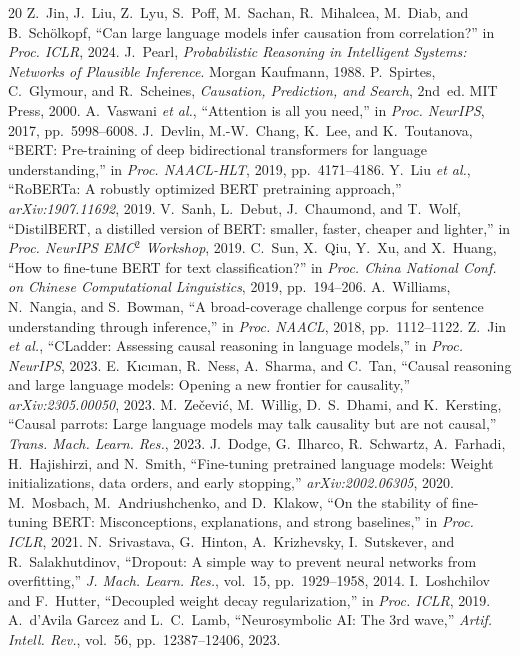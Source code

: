 \documentclass[conference]{IEEEtran}
\begin{document}
\begin{thebibliography}{20}
 Z.~Jin, J.~Liu, Z.~Lyu, S.~Poff, M.~Sachan, R.~Mihalcea, M.~Diab, and B.~Sch\"olkopf,
``Can large language models infer causation from correlation?'' in \emph{Proc. ICLR}, 2024.
 J.~Pearl, \emph{Probabilistic Reasoning in Intelligent Systems: Networks of Plausible
Inference}. Morgan Kaufmann, 1988.
 P.~Spirtes, C.~Glymour, and R.~Scheines, \emph{Causation, Prediction, and Search},
2nd~ed. MIT Press, 2000.
 A.~Vaswani \emph{et al.}, ``Attention is all you need,'' in \emph{Proc. NeurIPS}, 2017,
pp.~5998--6008.
 J.~Devlin, M.-W.~Chang, K.~Lee, and K.~Toutanova, ``BERT: Pre-training of deep bidirectional
transformers for language understanding,'' in \emph{Proc. NAACL-HLT}, 2019, pp.~4171--4186.
 Y.~Liu \emph{et al.}, ``RoBERTa: A robustly optimized BERT pretraining approach,''
\emph{arXiv:1907.11692}, 2019.
 V.~Sanh, L.~Debut, J.~Chaumond, and T.~Wolf, ``DistilBERT, a distilled version of BERT:
smaller, faster, cheaper and lighter,'' in \emph{Proc. NeurIPS EMC$^2$ Workshop}, 2019.
 C.~Sun, X.~Qiu, Y.~Xu, and X.~Huang, ``How to fine-tune BERT for text classification?'' in
\emph{Proc. China National Conf. on Chinese Computational Linguistics}, 2019, pp.~194--206.
 A.~Williams, N.~Nangia, and S.~Bowman, ``A broad-coverage challenge corpus for sentence
understanding through inference,'' in \emph{Proc. NAACL}, 2018, pp.~1112--1122.
 Z.~Jin \emph{et al.}, ``CLadder: Assessing causal reasoning in language models,'' in
\emph{Proc. NeurIPS}, 2023.
 E.~K\i c\i man, R.~Ness, A.~Sharma, and C.~Tan, ``Causal reasoning and large language
models: Opening a new frontier for causality,'' \emph{arXiv:2305.00050}, 2023.
 M.~Ze\v{c}evi\'c, M.~Willig, D.~S.~Dhami, and K.~Kersting, ``Causal parrots: Large language
models may talk causality but are not causal,'' \emph{Trans. Mach. Learn. Res.}, 2023.
 J.~Dodge, G.~Ilharco, R.~Schwartz, A.~Farhadi, H.~Hajishirzi, and N.~Smith, ``Fine-tuning
pretrained language models: Weight initializations, data orders, and early stopping,'' \emph{arXiv:2002.06305},
2020.
 M.~Mosbach, M.~Andriushchenko, and D.~Klakow, ``On the stability of fine-tuning BERT:
Misconceptions, explanations, and strong baselines,'' in \emph{Proc. ICLR}, 2021.
 N.~Srivastava, G.~Hinton, A.~Krizhevsky, I.~Sutskever, and R.~Salakhutdinov, ``Dropout: A
simple way to prevent neural networks from overfitting,'' \emph{J. Mach. Learn. Res.}, vol.~15, pp.~1929--1958,
2014.
 I.~Loshchilov and F.~Hutter, ``Decoupled weight decay regularization,'' in \emph{Proc.
ICLR}, 2019.
 A.~d'Avila Garcez and L.~C.~Lamb, ``Neurosymbolic AI: The 3rd wave,'' \emph{Artif. Intell.
Rev.}, vol.~56, pp.~12387--12406, 2023.
\end{thebibliography}
\end{document}
